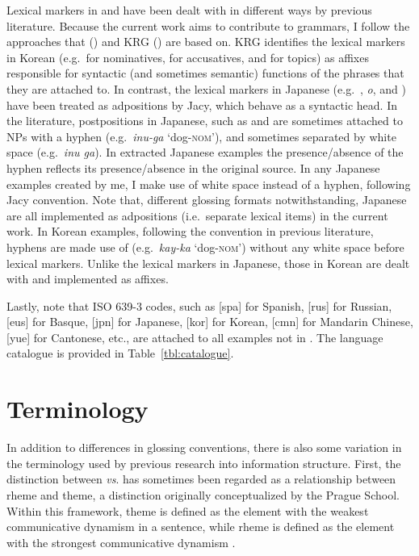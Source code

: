 Lexical markers in  and  have been dealt
with in different ways by previous literature. Because the current
work aims to contribute to  grammars, I follow the
approaches that  (\citealt{siegel:bender:02}) and KRG
(\citealt{kim:etal:11}) are based on.  KRG identifies the lexical
markers in Korean (e.g.\ \ika for nominatives, \lul for accusatives,
and \nun for topics) as affixes responsible for syntactic (and
sometimes semantic) functions of the phrases that they are attached
to. In contrast, the lexical markers in Japanese
(e.g.\ \ga, \textit{o}, and \wa) have been treated as adpositions by
Jacy, which behave as a syntactic head.  In the literature,
postpositions in Japanese, such as \ga and \wa are sometimes attached
to NPs with a hyphen (e.g.\ \textit{inu-ga} `dog-\textsc{nom}'), and
sometimes separated by white space (e.g.\ \textit{inu ga}).  In
extracted Japanese examples the presence/absence of the hyphen
reflects its presence/absence in the original source.  In any Japanese
examples created by me, I make use of white space instead of a hyphen,
following Jacy convention. Note that, different glossing formats
notwithstanding, Japanese  are all implemented as
adpositions (i.e.\ separate lexical items) in the current work.  In
Korean examples, following the convention in previous literature,
hyphens are made use of (e.g.\ \textit{kay-ka} `dog-\textsc{nom}')
without any white space before lexical markers. Unlike the lexical
markers in Japanese, those in Korean are dealt with and implemented as
affixes.



Lastly, note that ISO 639-3 codes, such as [spa] for Spanish, [rus]
for Russian, [eus] for Basque, [jpn] for Japanese, [kor] for Korean,
[cmn] for Mandarin Chinese, [yue] for Cantonese, etc., are attached to
all examples not in .  The language catalogue is provided
in Table~\ref{tbl:catalogue}.



\section{Terminology}
\label{1:sec:terminology}

In addition to differences in glossing conventions, there is also some
variation in the terminology used by previous research into
information structure. First, the distinction between 
\textit{vs}.  has sometimes been regarded as a relationship
between rheme and theme, a distinction originally conceptualized by
the Prague School.  Within this framework, theme is defined as the
element with the weakest communicative dynamism in a sentence, while
rheme is defined as the element with the strongest communicative
dynamism \citep[p.\ 72]{firbas:92}.



